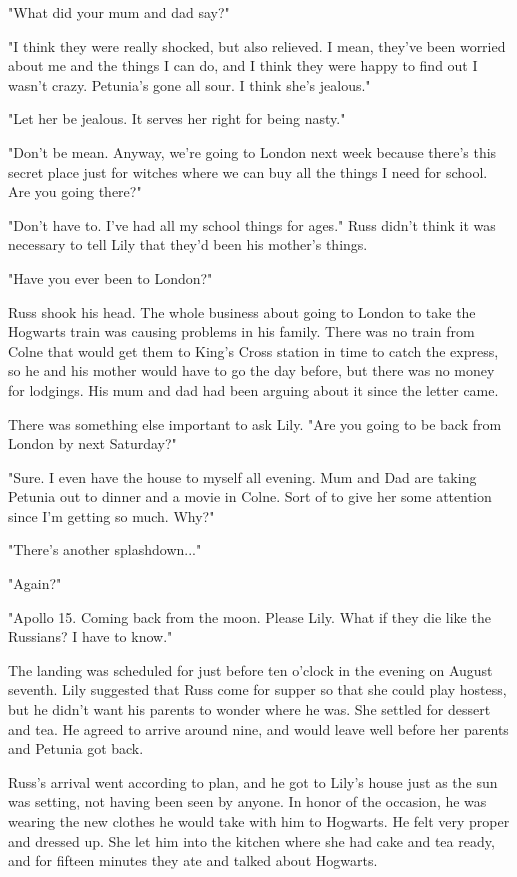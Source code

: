 \documentclass[a4paper,11pt]{article}
\begin{document}
"What did your mum and dad say?"

"I think they were really shocked, but also relieved. I mean, they've been worried about me and the things I can do, and I think they were happy to find out I wasn't crazy. Petunia's gone all sour. I think she's jealous."

"Let her be jealous. It serves her right for being nasty."

"Don't be mean. Anyway, we're going to London next week because there's this secret place just for witches where we can buy all the things I need for school. Are you going there?"

"Don't have to. I've had all my school things for ages." Russ didn't think it was necessary to tell Lily that they'd been his mother's things.

"Have you ever been to London?"

Russ shook his head. The whole business about going to London to take the Hogwarts train was causing problems in his family. There was no train from Colne that would get them to King's Cross station in time to catch the express, so he and his mother would have to go the day before, but there was no money for lodgings. His mum and dad had been arguing about it since the letter came.

There was something else important to ask Lily. "Are you going to be back from London by next Saturday?"

"Sure. I even have the house to myself all evening. Mum and Dad are taking Petunia out to dinner and a movie in Colne. Sort of to give her some attention since I'm getting so much. Why?"

"There's another splashdown..."

"Again?"

"Apollo 15. Coming back from the moon. Please Lily. What if they die like the Russians? I have to know."

The landing was scheduled for just before ten o'clock in the evening on August seventh. Lily suggested that Russ come for supper so that she could play hostess, but he didn't want his parents to wonder where he was. She settled for dessert and tea. He agreed to arrive around nine, and would leave well before her parents and Petunia got back.

Russ's arrival went according to plan, and he got to Lily's house just as the sun was setting, not having been seen by anyone. In honor of the occasion, he was wearing the new clothes he would take with him to Hogwarts. He felt very proper and dressed up. She let him into the kitchen where she had cake and tea ready, and for fifteen minutes they ate and talked about Hogwarts.
\end{document}
